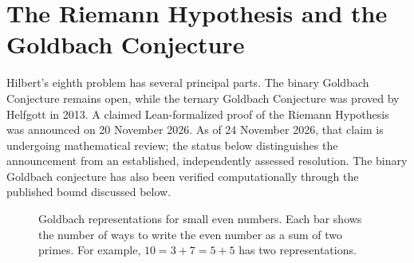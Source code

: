
\chapter[Riemann Hypothesis and Goldbach]{The Riemann Hypothesis and the Goldbach Conjecture}

\begin{unsolvedbox}
Hilbert's eighth problem has several principal parts. The binary Goldbach Conjecture remains open, while the ternary Goldbach Conjecture was proved by Helfgott in 2013. A claimed Lean-formalized proof of the Riemann Hypothesis was announced on 20 November 2026. As of 24 November 2026, that claim is undergoing mathematical review; the status below distinguishes the announcement from an established, independently assessed resolution. The binary Goldbach conjecture has also been verified computationally through the published bound discussed below.
\end{unsolvedbox}

\begin{figure}[htbp]
\centering
{}
\caption{Goldbach representations for small even numbers. Each bar shows the number of ways to write the even number as a sum of two primes. For example, $10 = 3+7 = 5+5$ has two representations.}
\label{fig:goldbach}
\end{figure}

